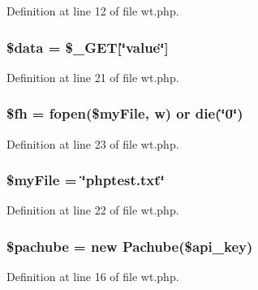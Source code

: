 Definition at line 12 of file wt.\+php.

\subsubsection[{\texorpdfstring{\$data}{$data}}]{\setlength{\rightskip}{0pt plus 5cm}\$data = \$\+\_\+\+G\+ET\mbox{[}\char`\"{}value\char`\"{}\mbox{]}}\hypertarget{wt_8php_a6efc15b5a2314dd4b5aaa556a375c6d6}{}\label{wt_8php_a6efc15b5a2314dd4b5aaa556a375c6d6}


Definition at line 21 of file wt.\+php.

\subsubsection[{\texorpdfstring{\$fh}{$fh}}]{\setlength{\rightskip}{0pt plus 5cm}\$fh = fopen(\$my\+File, \textquotesingle{}w\textquotesingle{}) or die(\char`\"{}0\char`\"{})}\hypertarget{wt_8php_a015aa0bda28030cbf1a64c0afb88f958}{}\label{wt_8php_a015aa0bda28030cbf1a64c0afb88f958}


Definition at line 23 of file wt.\+php.

\subsubsection[{\texorpdfstring{\$my\+File}{$myFile}}]{\setlength{\rightskip}{0pt plus 5cm}\$my\+File = \char`\"{}phptest.\+txt\char`\"{}}\hypertarget{wt_8php_aec8c77a99462294dbbfb1639bd8b5165}{}\label{wt_8php_aec8c77a99462294dbbfb1639bd8b5165}


Definition at line 22 of file wt.\+php.

\subsubsection[{\texorpdfstring{\$pachube}{$pachube}}]{\setlength{\rightskip}{0pt plus 5cm}\$pachube = new {\bf Pachube}(\$api\+\_\+key)}\hypertarget{wt_8php_a9adc98bad34c320e13c5844ae09f3898}{}\label{wt_8php_a9adc98bad34c320e13c5844ae09f3898}


Definition at line 16 of file wt.\+php.

